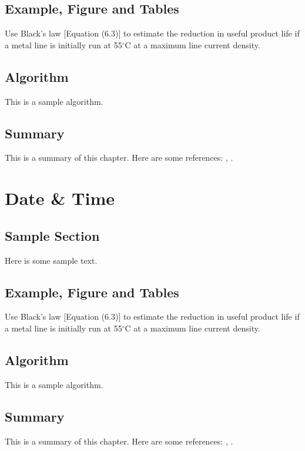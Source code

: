 \documentclass{wileySix}
\begin{document}
\section{Example, Figure and Tables}
\vskip6pt
\begin{example}
	Use Black's law [Equation (6.3)] to estimate the reduction in useful product
	life if a metal line is initially run at 55$^\circ$C at a maximum line
	current density.
\end{example}

\section{Algorithm}
This is a sample algorithm.

\section{Summary}
This is a summary of this chapter.
Here are some references: \cite{xkilby}, \cite{xberen}.

\chapter{Date & Time}

\section{Sample Section}
Here is some sample text.

\section{Example, Figure and Tables}
\vskip6pt
\begin{example}
	Use Black's law [Equation (6.3)] to estimate the reduction in useful product
	life if a metal line is initially run at 55$^\circ$C at a maximum line
	current density.
\end{example}

\section{Algorithm}
This is a sample algorithm.

\section{Summary}
This is a summary of this chapter.
Here are some references: \cite{xkilby}, \cite{xberen}.
\end{document}
